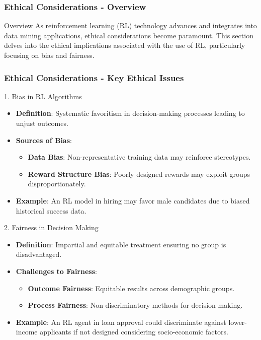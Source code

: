 \documentclass[aspectratio=169]{beamer}
\begin{document}
\begin{frame}[fragile]
    \frametitle{Ethical Considerations - Overview}
    \begin{block}{Overview}
        As reinforcement learning (RL) technology advances and integrates into data mining applications, ethical considerations become paramount. 
        This section delves into the ethical implications associated with the use of RL, particularly focusing on bias and fairness.
    \end{block}
\end{frame}

\begin{frame}[fragile]
    \frametitle{Ethical Considerations - Key Ethical Issues}
    \begin{block}{1. Bias in RL Algorithms}
        \begin{itemize}
            \item \textbf{Definition}: Systematic favoritism in decision-making processes leading to unjust outcomes.
            \item \textbf{Sources of Bias}:
            \begin{itemize}
                \item \textbf{Data Bias}: Non-representative training data may reinforce stereotypes.
                \item \textbf{Reward Structure Bias}: Poorly designed rewards may exploit groups disproportionately.
            \end{itemize}
            \item \textbf{Example}: An RL model in hiring may favor male candidates due to biased historical success data.
        \end{itemize}
    \end{block}
    
    \begin{block}{2. Fairness in Decision Making}
        \begin{itemize}
            \item \textbf{Definition}: Impartial and equitable treatment ensuring no group is disadvantaged.
            \item \textbf{Challenges to Fairness}:
            \begin{itemize}
                \item \textbf{Outcome Fairness}: Equitable results across demographic groups.
                \item \textbf{Process Fairness}: Non-discriminatory methods for decision making.
            \end{itemize}
            \item \textbf{Example}: An RL agent in loan approval could discriminate against lower-income applicants if not designed considering socio-economic factors.
        \end{itemize}
    \end{block}
\end{frame}
\end{document}
